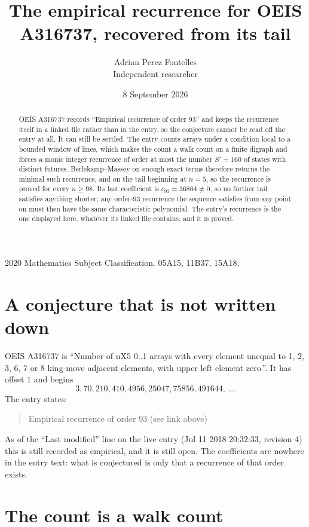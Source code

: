 \documentclass[11pt,a4paper]{article}
\title{The empirical recurrence for OEIS A316737, recovered from its tail}
\author{Adrian Perez Fontelles\\ \small Independent researcher}
\date{8 September 2026}
\theoremstyle{plain}
\theoremstyle{definition}
\begin{document}
\maketitle

\begin{abstract}
OEIS A316737 records ``Empirical recurrence of order $93$'' and keeps the recurrence itself in
a linked file rather than in the entry, so the conjecture cannot be read off the entry at all.
It can still be settled. The entry counts arrays under a condition local to a bounded window of
lines, which makes the count a walk count on a finite digraph and forces a monic integer
recurrence of order at most the number $S'=160$ of states with distinct futures. Berlekamp--Massey on
enough exact terms therefore returns the minimal such recurrence, and on the tail beginning at $n=5$, so the recurrence is proved for every $n\ge98$.
Its last coefficient is $c_{93}=36864\neq0$, so no further tail satisfies anything
shorter; any order-$93$ recurrence the sequence satisfies from any point on must then have
the same characteristic polynomial. The entry's recurrence is the one displayed here, whatever
its linked file contains, and it is proved.
\end{abstract}

\noindent\small 2020 Mathematics Subject Classification. 05A15, 11B37, 15A18.\normalsize

\section{A conjecture that is not written down}

OEIS A316737 is ``Number of nX5 0..1 arrays with every element unequal to 1, 2, 3, 6, 7 or 8 king-move adjacent elements, with upper left element zero.''. It has offset $1$ and begins
\[
3, 70, 210, 410, 4956, 25047, 75856, 491644,\ \dots
\]
The entry states:
\begin{quote}
Empirical recurrence of order 93 (see link above)
\end{quote}
As of the ``Last modified'' line on the live entry (Jul 11 2018 20:32:33, revision 4)
this is still recorded as empirical, and it is still open. The coefficients are nowhere in the
entry text: what is conjectured is only that a recurrence of that order exists.

\section{The count is a walk count}
\end{document}
